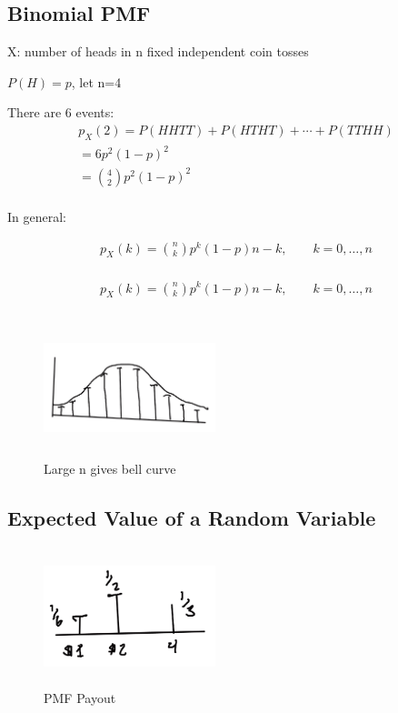 \subsection{Binomial PMF}


X: number of heads in n fixed independent coin tosses

$P(H)=p$, let n=4

There are 6 events:
\begin{align*}
p_X(2)=P(HHTT) + P(HTHT) + \cdots + P(TTHH)\\
=6p^2(1-p)^2 \\
={4 \choose 2} p^2(1-p)^2 \\
\end{align*}

In general:

\begin{align*}
p_X(k)={n \choose k} p^k(1-p)n-k, \qquad k=0,\ldots,n\\
\end{align*}

\begin{align*}
p_X(k)=\binom{n}{k} p^k(1-p)n-k, \qquad k=0,\ldots,n\\
\end{align*}


\begin{figure}[h]
\centering
\includegraphics[width=5cm, height=4cm]{images/L05/bern_norm_approx.jpeg}
\caption{Large n gives bell curve}
\end{figure}

\subsection{Expected Value of a Random Variable}


\begin{figure}[h]
\centering
\includegraphics[width=5cm, height=4cm]{images/L05/EX_rv.jpeg}
\caption{PMF Payout}
\end{figure}

